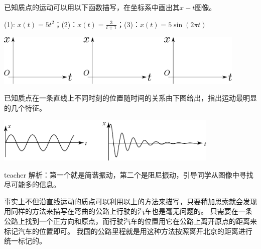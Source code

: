 \begin{example}
已知质点的运动可以用以下函数描写，在坐标系中画出其$x-t$图像。

(1): $x(t) = 5t^2$；(2)：$x(t) = \frac{3}{t+1}$；(3)：$x(t) = 5\sin(2\pi t)$
\begin{center}
\includegraphics[width=0.9\textwidth]{images/motion-problem-three-empty-coordinate.pdf} 
\end{center}
\end{example}



\begin{example}
已知质点在一条直线上不同时刻的位置随时间的关系由下图给出，指出运动最明显的几个特征。
\begin{center}
\includegraphics[width=0.8\textwidth]{images/motion-problem-4.pdf}
\end{center}
\begin{taggedblock}{teacher}
\noindent
解析：第一个就是简谐振动，第二个是阻尼振动，引导同学从图像中寻找尽可能多的信息。
\end{taggedblock}
\end{example}

事实上不但沿直线运动的质点可以利用以上的方法来描写，只要稍加思索就会发现用同样的方法来描写在弯曲的公路上行驶的汽车也是毫无问题的。
只需要在一条公路上找到一个正方向和原点，而行驶汽车的位置用它在公路上离开原点的距离来标记汽车的位置即可。
我国的公路里程就是用这种方法按照离开北京的距离进行统一标记的。


